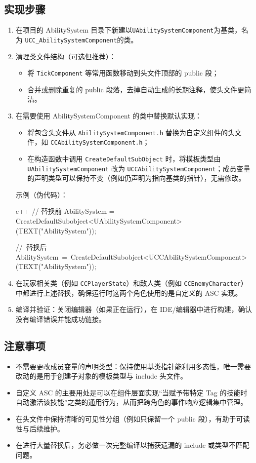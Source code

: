 \documentclass[10pt,CJKmath]{zhbook-v1}
\newcommand{\il}[1]{\texttt{#1}}%
\begin{document}
\subsection{实现步骤}
\begin{enumerate}
\item 在项目的 AbilitySystem 目录下新建以\il{UAbilitySystemComponent}为基类，名为 \il{UCC_AbilitySystemComponent}的类。
\item 清理类文件结构（可选但推荐）：
\begin{itemize}
\item 将 \texttt{TickComponent} 等常用函数移动到头文件顶部的 public 段；
\item 合并或删除重复的 public 段落，去掉自动生成的长期注释，使头文件更简洁。
\end{itemize}
\item 在需要使用 AbilitySystemComponent 的类中替换默认实现：
\begin{itemize}
\item 将包含头文件从 \texttt{AbilitySystemComponent.h} 替换为自定义组件的头文件，如 \il{CCAbilitySystemComponent.h}；
\item 在构造函数中调用 \il{CreateDefaultSubObject} 时，将模板类型由 \il{UAbilitySystemComponent} 改为 \texttt{UCCAbilitySystemComponent}；成员变量的声明类型可以保持不变（例如仍声明为指向基类的指针），无需修改。
\end{itemize}
示例（伪代码）：
\begin{amzcode}{c++}
// 替换前
AbilitySystem = CreateDefaultSubobject<UAbilitySystemComponent>(TEXT("AbilitySystem"));


// 替换后AbilitySystem = CreateDefaultSubobject<UCCAbilitySystemComponent>(TEXT("AbilitySystem"));
\end{amzcode}
\item 在玩家相关类（例如 \texttt{CCPlayerState}）和敌人类（例如 \texttt{CCEnemyCharacter}）中都进行上述替换，确保运行时这两个角色使用的是自定义的 ASC 实现。
\item 编译并验证：关闭编辑器（如果正在运行），在 IDE/编辑器中进行构建，确认没有编译错误并能成功链接。
\end{enumerate}

\subsection{注意事项}
\begin{itemize}
\item 不需要更改成员变量的声明类型：保持使用基类指针能利用多态性，唯一需要改动的是用于创建子对象的模板类型与 include 头文件。
\item 自定义 ASC 的主要用处是可以在组件层面实现“当赋予带特定 Tag 的技能时自动激活该技能”之类的通用行为，从而把跨角色的事件响应逻辑集中管理。
\item 在头文件中保持清晰的可见性分组（例如只保留一个 public 段），有助于可读性与后续维护。
\item 在进行大量替换后，务必做一次完整编译以捕获遗漏的 include 或类型不匹配问题。
\end{itemize}
\end{document}

